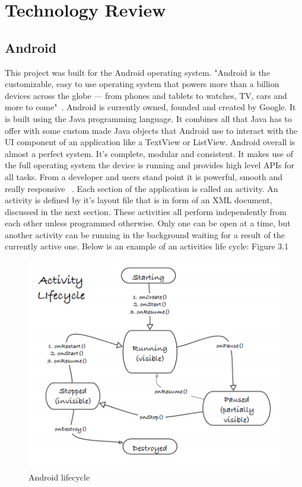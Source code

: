 \chapter{Technology Review}
\section{Android}
This project was built for the Android operating system. "Android is the customizable, easy to use operating system that powers more than a billion devices across the globe — from phones and tablets to watches, TV, cars and more to come"~\cite{android}. Android is currently owned, founded and created by Google. It is built using the Java programming language. It combines all that Java has to offer with some custom made Java objects that Android use to interact with the UI component of an application like a TextView or ListView. Android overall is almost a perfect system. It's complete, modular and consistent. It makes use of the full operating system the device is running and provides high level APIs for all tasks. From a developer and users stand point it is powerful, smooth and really responsive ~\cite{androidsystem}. Each section of the application is called an activity. An activity is defined by it's layout file that is in form of an XML document, discussed in the next section. These activities all perform independently from each other unless programmed otherwise. Only one can be open at a time, but another activity can be running in the background waiting for a result of the currently active one. Below is an example of an activities life cycle: Figure 3.1

\begin{figure}[h]
	\centering
	\includegraphics{img/activity-lifecycle.png}
	\caption{Android lifecycle}
\end{figure} 

